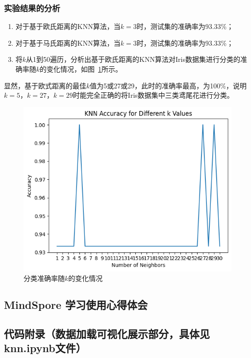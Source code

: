 \documentclass[12pt]{article}
\begin{document}
\subsubsection{实验结果的分析}

\begin{enumerate}
  \item 对于基于欧氏距离的KNN算法，当$k=3$时，测试集的准确率为93.33\%；
  \item 对于基于马氏距离的KNN算法，当$k=3$时，测试集的准确率为93.33\%；
  \item 将$k$从1到50遍历，分析出基于欧氏距离的KNN算法对Iris数据集进行分类的准确率随$k$的变化情况，如图~\ref{fig:accuracy}所示。
\end{enumerate}
显然，基于欧式距离的最佳$k$值为5或27或29，此时的准确率最高，为100\%，说明$k=5$，$k=27$，$k=29$时能完全正确的将Iris数据集中三类鸢尾花进行分类。

\begin{figure}[htbp]
  \centering
  \includegraphics[scale=0.8]{figures/knn/accuracy.png}
  \caption{分类准确率随$k$的变化情况}
  \label{fig:accuracy}
\end{figure}



\subsection{MindSpore 学习使用心得体会}

\subsection{代码附录（数据加载可视化展示部分，具体见knn.ipynb文件）}
\end{document}
